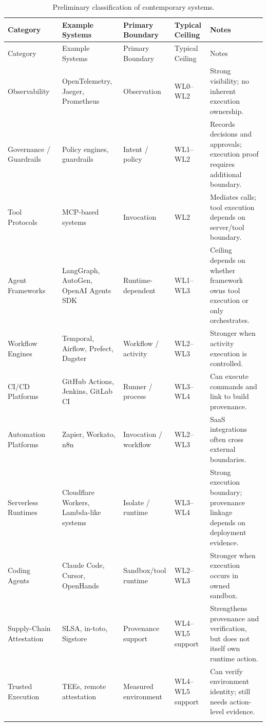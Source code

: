 \documentclass[11pt]{article}
\begin{document}
\begingroup
\footnotesize
\setlength{\tabcolsep}{3pt}
\renewcommand{\arraystretch}{1.12}
\begin{longtable}{@{}P{0.17\textwidth}P{0.22\textwidth}P{0.17\textwidth}P{0.14\textwidth}P{0.20\textwidth}@{}}
\toprule
Category & Example Systems & Primary Boundary & Typical Ceiling & Notes \\
\midrule
\endfirsthead
\toprule
Category & Example Systems & Primary Boundary & Typical Ceiling & Notes \\
\midrule
\endhead
Observability~\cite{opentelemetry_docs,opentelemetry_what_is} & OpenTelemetry, Jaeger, Prometheus & Observation & WL0--WL2 & Strong visibility; no inherent execution ownership. \\
Governance / Guardrails & Policy engines, guardrails & Intent / policy & WL1--WL2 & Records decisions and approvals; execution proof requires additional boundary. \\
Tool Protocols~\cite{mcp_intro,anthropic_mcp} & MCP-based systems & Invocation & WL2 & Mediates calls; tool execution depends on server/tool boundary. \\
Agent Frameworks~\cite{langgraph_persistence,autogen_repo,openai_agents_tracing} & LangGraph, AutoGen, OpenAI Agents SDK & Runtime-dependent & WL1--WL3 & Ceiling depends on whether framework owns tool execution or only orchestrates. \\
Workflow Engines~\cite{temporal_event_history,airflow_tasks} & Temporal, Airflow, Prefect, Dagster & Workflow / activity & WL2--WL3 & Stronger when activity execution is controlled. \\
CI/CD Platforms~\cite{github_actions_attestations,jenkins_durable_task} & GitHub Actions, Jenkins, GitLab CI & Runner / process & WL3--WL4 & Can execute commands and link to build provenance. \\
Automation Platforms~\cite{zapier_home,zapier_apps,n8n_executions,n8n_logging} & Zapier, Workato, n8n & Invocation / workflow & WL2--WL3 & SaaS integrations often cross external boundaries. \\
Serverless Runtimes~\cite{cloudflare_workers_how,cloudflare_workers_security} & Cloudflare Workers, Lambda-like systems & Isolate / runtime & WL3--WL4 & Strong execution boundary; provenance linkage depends on deployment evidence. \\
Coding Agents~\cite{openhands_platform_2024,agentforge_2026} & Claude Code, Cursor, OpenHands & Sandbox/tool runtime & WL2--WL3 & Stronger when execution occurs in owned sandbox. \\
Supply-Chain Attestation~\cite{slsa_provenance,intoto_attestation} & SLSA, in-toto, Sigstore & Provenance support & WL4--WL5 support & Strengthens provenance and verification, but does not itself own runtime action. \\
Trusted Execution~\cite{attestable_builds_2025,zk_compilation_2026,evidence_ci_2026} & TEEs, remote attestation & Measured environment & WL4--WL5 support & Can verify environment identity; still needs action-level evidence. \\
\bottomrule
\caption{Preliminary classification of contemporary systems.}
\end{longtable}
\endgroup
\end{document}
